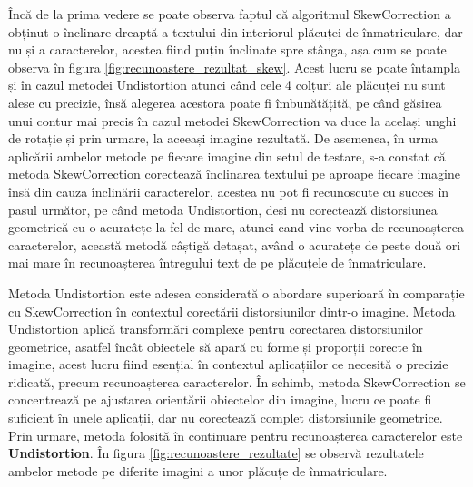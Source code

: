 \documentclass[12pt]{article}
\begin{document}
\^{I}nc\u{a} de la prima vedere se poate observa faptul c\u{a} algoritmul SkewCorrection a obținut o \^{i}nclinare dreapt\u{a} a textului din interiorul pl\u{a}cuței de \^{i}nmatriculare, dar nu și a caracterelor, acestea fiind puțin \^{i}nclinate spre st\^{a}nga, așa cum se poate observa \^{i}n figura \ref{fig:recunoastere_rezultat_skew}. Acest lucru se poate \^{i}ntampla și \^{i}n cazul metodei Undistortion atunci c\^{a}nd cele 4 colțuri ale pl\u{a}cuței nu sunt alese cu precizie, \^{i}ns\u{a} alegerea acestora poate fi \^{i}mbun\u{a}t\u{a}țit\u{a}, pe c\^{a}nd g\u{a}sirea unui contur mai precis \^{i}n cazul metodei SkewCorrection va duce la același unghi de rotație și prin urmare, la aceeași imagine rezultat\u{a}. De asemenea, \^{i}n urma aplic\u{a}rii ambelor metode pe fiecare imagine din setul de testare, s-a constat c\u{a} metoda SkewCorrection corecteaz\u{a} \^{i}nclinarea textului pe aproape fiecare imagine \^{i}ns\u{a} din cauza \^{i}nclin\u{a}rii caracterelor, acestea nu pot fi recunoscute cu succes \^{i}n pasul urm\u{a}tor, pe c\^{a}nd metoda Undistortion, deși nu corecteaz\u{a} distorsiunea geometric\u{a} cu o acuratețe la fel de mare, atunci cand vine vorba de recunoașterea caracterelor, aceast\u{a} metod\u{a} c\^{a}știg\u{a} detașat, av\^{a}nd o acuratețe de peste dou\u{a} ori mai mare \^{i}n recunoașterea \^{i}ntregului text de pe pl\u{a}cuțele de \^{i}nmatriculare.

Metoda Undistortion este adesea considerat\u{a} o abordare superioar\u{a} \^{i}n comparație cu SkewCorrection \^{i}n contextul corect\u{a}rii distorsiunilor dintr-o imagine. Metoda Undistortion aplic\u{a} transform\u{a}ri complexe pentru corectarea distorsiunilor geometrice, asatfel \^{i}nc\^{a}t obiectele s\u{a} apar\u{a} cu forme și proporții corecte \^{i}n imagine, acest lucru fiind esențial \^{i}n contextul aplicațiilor ce necesit\u{a} o precizie ridicat\u{a}, precum recunoașterea caracterelor. \^{I}n schimb, metoda SkewCorrection se concentreaz\u{a} pe ajustarea orient\u{a}rii obiectelor din imagine, lucru ce poate fi suficient \^{i}n unele aplicații, dar nu corecteaz\u{a} complet distorsiunile geometrice. Prin urmare, metoda folosit\u{a} \^{i}n continuare pentru recunoașterea caracterelor este \textbf{Undistortion}. \^{I}n figura \ref{fig:recunoastere_rezultate} se observ\u{a} rezultatele ambelor metode pe diferite imagini a unor pl\u{a}cuțe de \^{i}nmatriculare.
\end{document}
